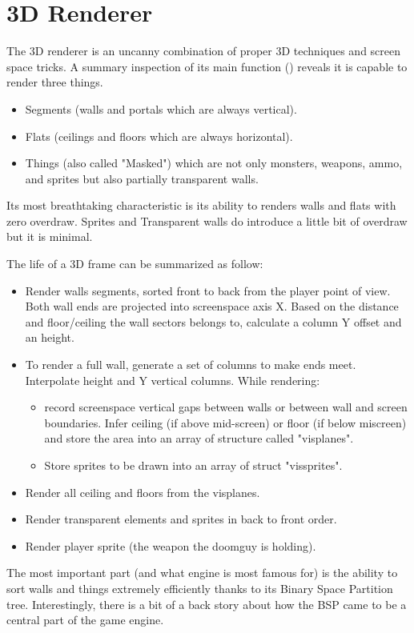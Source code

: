 \section{3D Renderer}
The 3D renderer is an uncanny combination of proper 3D techniques and screen space tricks. A summary inspection of its main function () reveals it is capable to render three things.\\
\par
{}
\par
\begin{itemize}
	\item Segments (walls and portals which are always vertical).
	\item Flats (ceilings and floors which are always horizontal).
	\item Things (also called "Masked") which are not only monsters, weapons, ammo, and sprites but also partially transparent walls.
\end{itemize}
 Its most breathtaking characteristic is its ability to renders walls and flats with zero overdraw. Sprites and Transparent walls do introduce a little bit of overdraw but it is minimal.\\
\par
The life of a 3D frame can be summarized as follow:
\begin{itemize}
\item Render walls segments, sorted front to back from the player point of view. Both wall ends are projected into screenspace axis X. Based on the distance and floor/ceiling the wall sectors belongs to, calculate a column Y offset and an height. 
\item To render a full wall, generate a set of columns to make ends meet. Interpolate height and Y vertical columns. While rendering:
   \begin{itemize}
     \item record screenspace vertical gaps between walls or between wall and screen boundaries. Infer ceiling (if above mid-screen) or floor (if below miscreen) and store the area into an array of structure called "visplanes".
     \item Store sprites to be drawn into an array of struct "vissprites".
   \end{itemize}      
\item Render all ceiling and floors from the visplanes.
\item Render transparent elements and sprites in back to front order.
\item Render player sprite (the weapon the doomguy is holding).
\end{itemize}
\par
The most important part (and what \doom{}engine is most famous for) is the ability to sort walls and things extremely efficiently thanks to its Binary Space Partition tree. Interestingly, there is a bit of a back story about how the BSP came to be a central part of the game engine.\\
\par
\pagebreak



